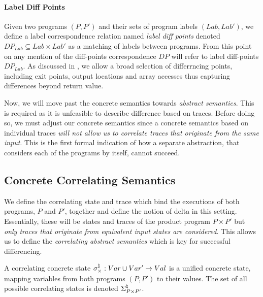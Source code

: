 \paragraph{Label Diff Points} 
Given two programs $(P,P')$ and their sets of program labels $(Lab,Lab')$, we define a label correspondence relation named \emph{label diff points} denoted $DP_{Lab} \subseteq Lab \times Lab'$ as a matching of labels between programs. From this point on any mention of the diff-points correspondence $DP$ will refer to label diff-points $DP_{Lab}$. As discussed in , we allow a broad selection of differrncing points, including exit points, output locations and array accesses thus capturing differences beyond return value. %

Now, we will move past the concrete semantics towards \emph{abstract semantics}. This is required as it is unfeasible to describe difference based on traces. Before doing so, we must adjust our concrete semantics since a concrete semantics based on individual traces \emph{will not allow us to correlate traces that originate from the same input}. This is the first formal indication of how a separate abstraction, that considers each of the programs by itself, cannot succeed.

\subsection{Concrete Correlating Semantics} 

We define the correlating state and trace which bind the executions of both programs, $P$ and $P'$, together and define the notion of delta in this setting. Essentially, these will be states and traces of the product program $P \times P'$ but \emph{only traces that originate from equivalent input states are considered}. This allows us to define the \emph{correlating abstract semantics} which is key for successful differencing.

\begin{definition}
A correlating concrete state $\sigma^\natural_{\times} : Var \cup Var' \rightarrow Val$ is a unified concrete state, mapping variables from both programs $(P,P')$ to their values. The set of all possible correlating states is denoted $\Sigma^\natural_{P \times P'}$.
\end{definition}

